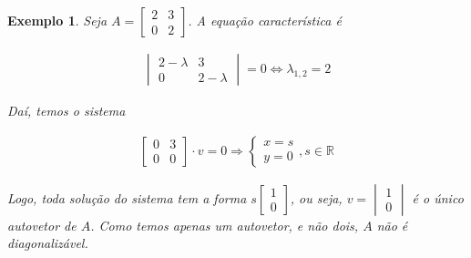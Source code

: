 \documentclass{article}
\newtheorem*{example}{Exemplo}
\begin{document}
\begin{example}
	Seja $A = \begin{bmatrix}
	2 & 3 \\
	0 & 2
	\end{bmatrix}$. A equação característica é
	
	\begin{align*}
	\begin{vmatrix}
	2 - \lambda & 3 \\
	0 & 2 - \lambda 
	\end{vmatrix} = 0 \Leftrightarrow \lambda_{1,2} = 2
	\end{align*}
	
	\par\vspace{0.3cm} Daí, temos o sistema
	
	\begin{align*}
	\begin{bmatrix}
	0 & 3 \\
	0 & 0 
	\end{bmatrix}\cdot v = 0 \Rightarrow \begin{cases}
	x = s\\
	y = 0
	\end{cases}, s\in\mathbb{R}
	\end{align*}
	
	\par\vspace{0.3cm} Logo, toda solução do sistema tem a forma $s\begin{bmatrix}
	1\\
	0
	\end{bmatrix}$, ou seja, $v = \begin{vmatrix}
	1\\
	0
	\end{vmatrix}$ é o único autovetor de $A$. Como temos apenas um autovetor, e não dois, $A$ não é diagonalizável. 
	
\end{example}
\end{document}
